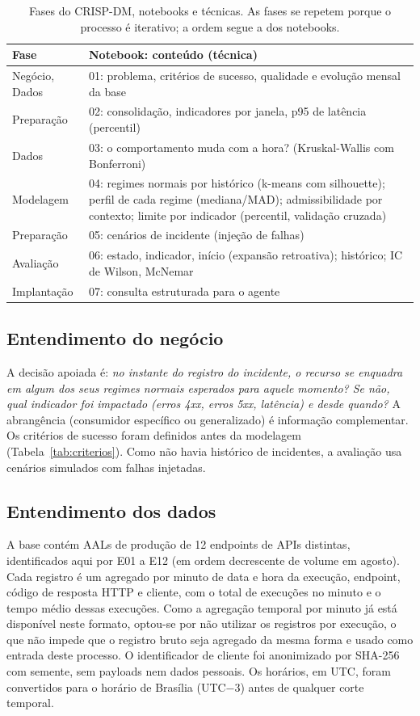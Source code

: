 \documentclass[sigconf,nonacm]{acmart}
\begin{document}
\begin{table}[t]
  \caption{Fases do CRISP-DM, notebooks e técnicas. As fases se repetem porque
  o processo é iterativo; a ordem segue a dos notebooks.}
  \label{tab:fases}
  \small
  \begin{tabular}{p{}p{}}
    \toprule
    Fase & Notebook: conteúdo (técnica) \\
    \midrule
    Negócio, Dados & 01: problema, critérios de sucesso, qualidade e evolução mensal da base \\
    Preparação & 02: consolidação, indicadores por janela, p95 de latência (percentil) \\
    Dados & 03: o comportamento muda com a hora? (Kruskal-Wallis com Bonferroni) \\
    Modelagem & 04: regimes normais por histórico (k-means com silhouette); perfil de cada regime (mediana/MAD); admissibilidade por contexto; limite por indicador (percentil, validação cruzada) \\
    Preparação & 05: cenários de incidente (injeção de falhas) \\
    Avaliação & 06: estado, indicador, início (expansão retroativa); histórico; IC de Wilson, McNemar \\
    Implantação & 07: consulta estruturada para o agente \\
    \bottomrule
  \end{tabular}
\end{table}

\subsection{Entendimento do negócio}
A decisão apoiada é: \emph{no instante do registro do incidente, o recurso se enquadra em algum dos seus regimes normais esperados para aquele momento? Se não, qual indicador foi impactado (erros 4xx, erros 5xx, latência) e desde quando?} A abrangência (consumidor específico ou generalizado) é informação complementar. Os critérios de sucesso foram definidos antes da modelagem (Tabela~\ref{tab:criterios}). Como não havia histórico de incidentes, a avaliação usa cenários simulados com falhas injetadas.

\subsection{Entendimento dos dados}
A base contém AALs de produção de 12 endpoints de APIs distintas, identificados aqui por E01 a E12 (em ordem decrescente de volume em agosto). Cada registro é um agregado por minuto de data e hora da execução, endpoint, código de resposta HTTP e cliente, com o total de execuções no minuto e o tempo médio dessas execuções. Como a agregação temporal por minuto já está disponível neste formato, optou-se por não utilizar os registros por execução, o que não impede que o registro bruto seja agregado da mesma forma e usado como entrada deste processo. O identificador de cliente foi anonimizado por SHA-256 com semente, sem payloads nem dados pessoais. Os horários, em UTC, foram convertidos para o horário de Brasília (UTC$-3$) antes de qualquer corte temporal.
\end{document}
